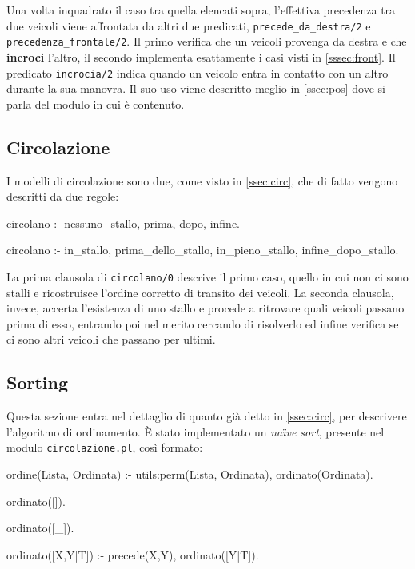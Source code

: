 Una volta inquadrato il caso tra quella elencati sopra, l'effettiva precedenza tra due veicoli viene affrontata da altri due predicati, \texttt{precede\_da\_destra/2} e \texttt{precedenza\_frontale/2}. Il primo verifica che un veicoli provenga da destra e che \textbf{incroci} l'altro, il secondo implementa esattamente i casi visti in \ref{sssec:front}. Il predicato \texttt{incrocia/2} indica quando un veicolo entra in contatto con un altro durante la sua manovra. Il suo uso viene descritto meglio in \ref{ssec:pos} dove si parla del modulo in cui è contenuto.

\subsection{Circolazione}
I modelli di circolazione sono due, come visto in \ref{ssec:circ}, che di fatto vengono descritti da due regole:

\begin{verbatimtab}
circolano :-
	nessuno_stallo,
	prima,
	dopo,
	infine.

circolano :-
	in_stallo,
	prima_dello_stallo,
	in_pieno_stallo,
	infine_dopo_stallo.
\end{verbatimtab}

La prima clausola di \texttt{circolano/0} descrive il primo caso, quello in cui non ci sono stalli e ricostruisce l'ordine corretto di transito dei veicoli. La seconda clausola, invece, accerta l'esistenza di uno stallo e procede a ritrovare quali veicoli passano prima di esso, entrando poi nel merito cercando di risolverlo ed infine verifica se ci sono altri veicoli che passano per ultimi.

\subsection{Sorting}
Questa sezione entra nel dettaglio di quanto già detto in \ref{ssec:circ}, per descrivere l'algoritmo di ordinamento. È stato implementato un \emph{na\"{\i}ve sort}\cite{Clocksin:2003}, presente nel modulo \texttt{circolazione.pl}, così formato:
\begin{verbatimtab}
ordine(Lista, Ordinata) :-
	utils:perm(Lista, Ordinata),
	ordinato(Ordinata).

ordinato([]).

ordinato([_]).

ordinato([X,Y|T]) :-
	precede(X,Y),
	ordinato([Y|T]).
\end{verbatimtab}


